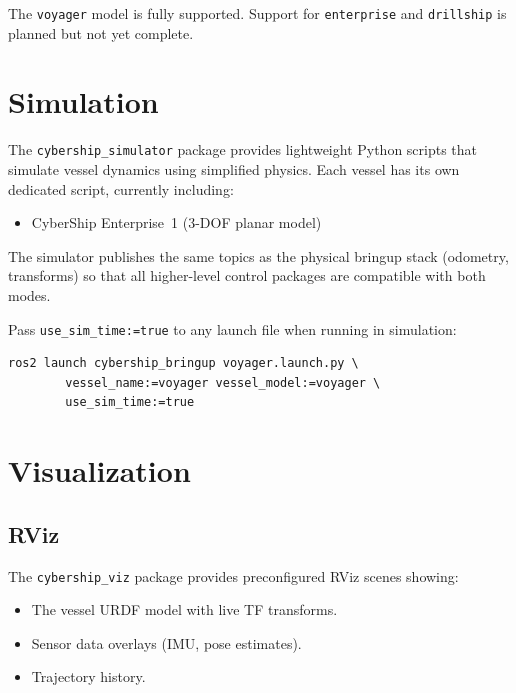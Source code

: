 \documentclass[12pt,a4paper]{article}
\begin{document}
	The \texttt{voyager} model is fully supported. Support for \texttt{enterprise} and
	\texttt{drillship} is planned but not yet complete.
	
	\section{Simulation}
	\label{sec:simulation}
	
	The \texttt{cybership\_simulator} package provides lightweight Python scripts that simulate
	vessel dynamics using simplified physics. Each vessel has its own dedicated script, currently
	including:
	
	\begin{itemize}
		\item CyberShip Enterprise~1 (3-DOF planar model)
	\end{itemize}
	
	The simulator publishes the same topics as the physical bringup stack (odometry, transforms)
	so that all higher-level control packages are compatible with both modes.
	
	Pass \texttt{use\_sim\_time:=true} to any launch file when running in simulation:
	
	\begin{lstlisting}[style=bash]
		ros2 launch cybership_bringup voyager.launch.py \
		vessel_name:=voyager vessel_model:=voyager \
		use_sim_time:=true
	\end{lstlisting}
	
	\section{Visualization}
	\label{sec:visualization}
	
	\subsection{RViz}
	
	The \texttt{cybership\_viz} package provides preconfigured RViz scenes showing:
	
	\begin{itemize}
		\item The vessel URDF model with live TF transforms.
		\item Sensor data overlays (IMU, pose estimates).
		\item Trajectory history.
	\end{itemize}
	
\end{document}
